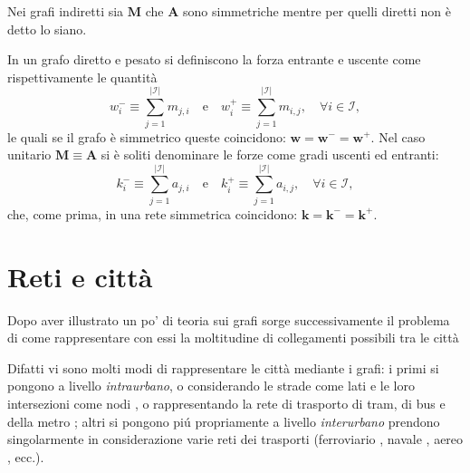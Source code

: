         \begin{oss}
            Nei grafi indiretti sia \(\mathbf M\) che \(\mathbf A\) sono simmetriche mentre per quelli diretti non è detto lo siano.
        \end{oss}

        \begin{dfn}
            \label{defForzaGradoEntranteUscente}
            In un grafo diretto e pesato si definiscono la forza entrante e uscente come rispettivamente le quantità
            \begin{equation}
                \label{eqForzaGrafoDiretto}
                w^-_i\equiv\sum_{j=1}^{\vert\mathcal I\vert}m_{j,i}%
                \quad\text{e}\quad
                w^+_i\equiv\sum_{j=1}^{\vert\mathcal I\vert}m_{i,j},%
                \quad\forall i\in\mathcal I,
            \end{equation}
            le quali se il grafo è simmetrico queste coincidono: \(\mathbf w=\mathbf w^-=\mathbf w^+\). Nel caso unitario \(\mathbf M\equiv\mathbf A\) si è soliti denominare le forze come gradi uscenti ed entranti:
            \begin{equation}
                \label{eqGradoGrafoDiretto}
                k^-_i\equiv\sum_{j=1}^{\vert\mathcal I\vert}a_{j,i}%
                \quad\text{e}\quad
                k^+_i\equiv\sum_{j=1}^{\vert\mathcal I\vert}a_{i,j},%
                \quad\forall i\in\mathcal I,
            \end{equation}
            che, come prima, in una rete simmetrica coincidono: \(\mathbf k=\mathbf k^-=\mathbf k^+\).
        \end{dfn}

    \section{Reti e città}\label{secRetiECittà}

        Dopo aver illustrato un po' di teoria sui grafi sorge successivamente il problema di come rappresentare con essi la moltitudine di collegamenti possibili tra le città
        
        Difatti vi sono molti modi di rappresentare le città mediante i grafi: i primi si pongono a livello \textit{intraurbano}, o considerando le strade come lati e le loro intersezioni come nodi \cite[§ 3.1.3.1 p. 17]{Barthelemy2011}, o rappresentando la rete di trasporto di tram, di bus e della metro \cite[§ 3.2.1 p. 22]{Barthelemy2011}; altri si pongono piú propriamente a livello \textit{interurbano} prendono singolarmente in considerazione varie reti dei trasporti (ferroviario \cite[§ 3.1.3.2 p. 17]{Barthelemy2011}, navale \cite[§ 3.1.4 p. 19]{Barthelemy2011}, aereo \cite[§ 3.1.2 p. 13]{Barthelemy2011}, ecc.).

